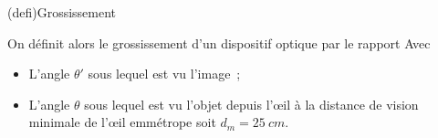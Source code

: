 \documentclass[../../main/main.tex]{subfiles}
\begin{document}
\bigskip

\begin{tcbraster}[raster columns=3, raster equal height=rows]
	\begin{tcb}[label=def_gross, raster multicolumn=2, sidebyside](defi){Grossissement}

		On définit alors le grossissement d'un dispositif optique par le rapport
		Avec
		\begin{itemize}[label=$\diamond$, leftmargin=10pt]
			\item L'angle $\theta'$ sous lequel est vu l'image~;
			\item L'angle $\theta$ sous lequel est vu l'objet depuis l'œil à la
			      distance de vision minimale de l'œil emmétrope soit $d_m
				      = \SI{25}{cm}$.
		\end{itemize}
		\tcblower
		\begin{center}

\end{center}
\end{tcb}
\end{tcbraster}
\end{document}
